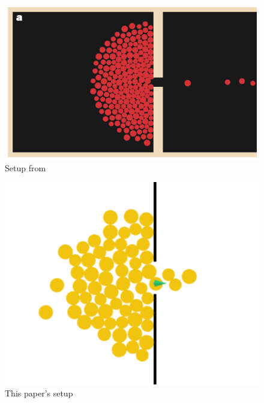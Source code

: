 \documentclass[11pt]{article}
\begin{document}
\begin{minipage}{.4\textwidth}
		\begin{figure}[H]
			\centering
			\includegraphics[width=1\linewidth]{assets/helbling-experiment-1}\\
			Setup from \cite{Helbing}
		\end{figure}
	\end{minipage}
	\begin{minipage}{.2\textwidth}	
	\vfill\hfill
	\end{minipage}
	\begin{minipage}{.4\textwidth}
		\begin{figure}[H]
			\centering
			\includegraphics[width=.75\linewidth]{assets/experiment-1}\\
			This paper's setup
		\end{figure}
	\end{minipage}
	\\\\
\end{document}
